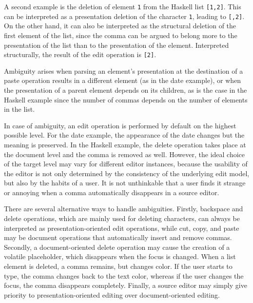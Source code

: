 A second example is the deletion of element \verb|1| from the Haskell list \verb|[1,2]|. This can be interpreted as a presentation deletion of the character \verb|1|, leading to \verb|[,2]|.  On the other hand, it can also be interpreted as the structural deletion of the first element of the list, since the comma can be argued to belong more to the presentation of the list than to the presentation of the element. Interpreted structurally, the result of the edit operation is \verb|[2]|. 

Ambiguity arises when parsing an element's presentation at the destination of a paste operation results in a different element (as in the date example), or when the presentation of a parent element depends on its children, as is the case in the Haskell example since the number of commas depends on the number of elements in the list. 


In case of ambiguity, an edit operation is performed by default on the highest possible level. For the date example, the appearance of the date changes but the meaning is preserved. In the Haskell example, the delete operation takes place at the document level and the comma is removed as well. However, the ideal choice of the target level may vary for different editor instances, because the usability of the editor is not only determined by the consistency of the underlying edit model, but also by the habits of a user. It is not unthinkable that a user finds it strange or annoying when a comma automatically disappears in a source editor. 

There are several alternative ways to handle ambiguities. Firstly, backspace and delete operations, which are mainly used for deleting characters, can always be interpreted as presentation-oriented edit operations, while cut, copy, and paste may be document operations that automatically insert and remove commas. Secondly, a document-oriented delete operation may cause the creation of a volatile placeholder, which disappears when the focus is changed. When a list element is deleted, a comma remains, but changes color. If the user starts to type, the comma changes back to the text color, whereas if the user changes the focus, the comma disappears completely. Finally, a source editor may simply give priority to presentation-oriented editing over document-oriented editing. 

